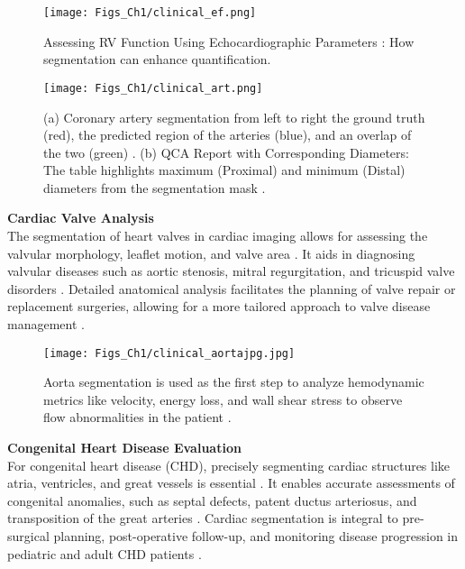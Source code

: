 \begin{figure}[t!]
\centering
\texttt{[image: Figs\_Ch1/clinical\_ef.png]}
\caption{Assessing RV Function Using Echocardiographic Parameters \cite{mahendiran2025angiopy}: How segmentation can enhance quantification.}
\label{fig1_6}
\end{figure}

\begin{figure}[t!]
\centering
\texttt{[image: Figs\_Ch1/clinical\_art.png]}
\caption{(a) Coronary artery segmentation from left to right the ground truth (red), the predicted region of the arteries (blue), and an overlap of the two (green) \cite{pan2021coronary}. (b) QCA Report with Corresponding Diameters: The table highlights maximum (Proximal) and minimum (Distal) diameters from the segmentation mask \cite{iyer2021angionet}.}
\label{fig1_7}
\end{figure}

\noindent \textbf{Cardiac Valve Analysis}\\
The segmentation of heart valves in cardiac imaging allows for assessing the valvular morphology, leaflet motion, and valve area \cite{balu2019deep}. It aids in diagnosing valvular diseases such as aortic stenosis, mitral regurgitation, and tricuspid valve disorders \cite{long2024deep}. Detailed anatomical analysis facilitates the planning of valve repair or replacement surgeries, allowing for a more tailored approach to valve disease management \cite{nedadur2022artificial}.\\


\begin{figure}[t!]
\centering
\texttt{[image: Figs\_Ch1/clinical\_aortajpg.jpg]}
\caption{Aorta segmentation is used as the first step to analyze hemodynamic metrics like velocity, energy loss, and wall shear stress to observe flow abnormalities in the patient \cite{garcia2019role}.}
\label{fig1_8}
\end{figure}

\noindent \textbf{Congenital Heart Disease Evaluation}\\
For congenital heart disease (CHD), precisely segmenting cardiac structures like atria, ventricles, and great vessels is essential \cite{yao2023graph}. It enables accurate assessments of congenital anomalies, such as septal defects, patent ductus arteriosus, and transposition of the great arteries \cite{sharobeem2022validation}. Cardiac segmentation is integral to pre-surgical planning, post-operative follow-up, and monitoring disease progression in pediatric and adult CHD patients \cite{sun2019personalized}.\\

